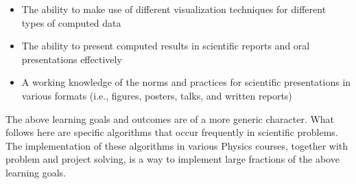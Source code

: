 \documentclass[graybox,envcountchap,sectrefs]{svmult}
\begin{document}
\begin{itemize}
\item The ability to make use of different visualization techniques for different types of computed data

\item The ability to present computed results in scientific reports and oral presentations effectively

\item A working knowledge of the norms and practices for scientific presentations in various formats (i.e., figures, posters, talks, and written reports)
\end{itemize}

\noindent
The above learning goals and outcomes are of a more generic character. What follows here are specific
algorithms that occur frequently in scientific problems. The implementation of these algorithms in various Physics courses, together with problem and project solving, is a way to implement large fractions of the above learning goals. 
\end{document}
